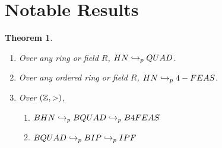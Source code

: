 \documentclass[twoside]{article}
\newtheorem{theorem}{Theorem}[section]
\begin{document}
\section{Notable Results}

\begin{theorem}
  \begin{enumerate}
  \item Over any ring or field $R$, $HN \hookrightarrow_p QUAD$.
  \item Over any ordered ring or field $R$, $HN \hookrightarrow_p 4-FEAS$.
  \item Over $(\mathbb{Z}, >)$, 
    \begin{enumerate}
    \item $BHN \hookrightarrow_p BQUAD \hookrightarrow_p B4FEAS$
    \item $BQUAD \hookrightarrow_p BIP \hookrightarrow_p IPF$
    \end{enumerate}
  \end{enumerate}
\end{theorem}


\end{document}
